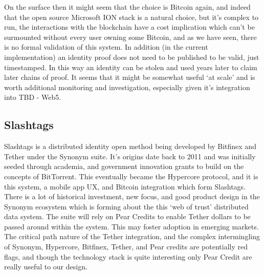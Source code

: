 On the surface then it might seem that the choice is Bitcoin again, and indeed that the open source Microsoft ION stack is a natural choice, but it's complex to run, the interactions with the blockchain have a cost implication which can't be surmounted without every user owning some Bitcoin, and as we have seen, there is no formal validation of this system. In addition (in the current implementation) an identity proof does not need to be published to be valid, just timestamped. In this way an identity can be stolen and used years later to claim later chains of proof. It seems that it might be somewhat useful `at scale' and is worth additional monitoring and investigation, especially given it's integration into TBD - Web5.
\subsection{Slashtags}
Slashtags is a distributed identity open method being developed by Bitfinex and Tether under the Synonym suite. It's origins date back to 2011 and was initially seeded through academia, and government innovation grants to build on the concepts of BitTorrent. This eventually became the Hypercore protocol, and it is this system, a mobile app UX, and Bitcoin integration which form Slashtags. There is a lot of historical investment, new focus, and good product design in the Synonym ecosystem which is forming about the this `web of trust' distributed data system. The suite will rely on Pear Credits to enable Tether dollars to be passed around within the system. This may foster adoption in emerging markets. The critical path nature of the Tether integration, and the complex intermingling of Synonym, Hypercore, Bitfinex, Tether, and Pear credits are potentially red flags, and though the technology stack is quite interesting only Pear Credit are really useful to our design. 
